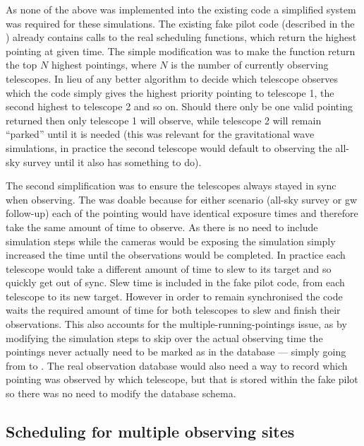\begin{colsection}
\begin{colsection}
As none of the above was implemented into the existing code a simplified system was required for these simulations. The existing fake pilot code (described in the ) already contains calls to the real scheduling functions, which return the highest pointing at given time. The simple modification was to make the function return the top $N$ highest pointings, where $N$ is the number of currently observing telescopes. In lieu of any better algorithm to decide which telescope observes which the code simply gives the highest priority pointing to telescope 1, the second highest to telescope 2 and so on. Should there only be one valid pointing returned then only telescope 1 will observe, while telescope 2 will remain ``parked'' until it is needed (this was relevant for the gravitational wave simulations, in practice the second telescope would default to observing the all-sky survey until it also has something to do).

The second simplification was to ensure the telescopes always stayed in sync when observing. The was doable because for either scenario (all-sky survey or \gls{gw} follow-up) each of the pointing would have identical exposure times and therefore take the same amount of time to observe. As there is no need to include simulation steps while the cameras would be exposing the simulation simply increased the time until the observations would be completed. In practice each telescope would take a different amount of time to slew to its target and so quickly get out of sync. Slew time is included in the fake pilot code, from each telescope to its new target. However in order to remain synchronised the code waits the required amount of time for both telescopes to slew and finish their observations. This also accounts for the multiple-running-pointings issue, as by modifying the simulation steps to skip over the actual observing time the pointings never actually need to be marked as  in the database --- simply going from  to . The real observation database would also need a way to record which pointing was observed by which telescope, but that is stored within the fake pilot so there was no need to modify the database schema.

\end{colsection}


\subsection{Scheduling for multiple observing sites}
\label{sec:multi_site_scheduling}
\begin{colsection}


\end{colsection}
\end{colsection}
